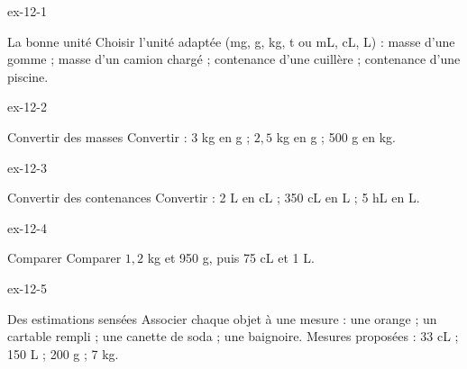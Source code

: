 \clearpage{}
\begin{blocLivre}{ex-12-1}\begin{exercice}[1]{La bonne unité}
Choisir l’unité adaptée (mg, g, kg, t ou mL, cL, L) : masse d’une gomme ; masse d’un camion chargé ; contenance d’une cuillère ; contenance d’une piscine.
\end{exercice}\end{blocLivre}
\begin{blocLivre}{ex-12-2}\begin{exercice}[1]{Convertir des masses}
Convertir : 3 kg en g ; $2{,}5$ kg en g ; 500 g en kg.
\end{exercice}\end{blocLivre}
\begin{blocLivre}{ex-12-3}\begin{exercice}[1]{Convertir des contenances}
Convertir : 2 L en cL ; 350 cL en L ; 5 hL en L.
\end{exercice}\end{blocLivre}
\begin{blocLivre}{ex-12-4}\begin{exercice}[1]{Comparer}
Comparer $1{,}2$ kg et 950 g, puis 75 cL et 1 L.
\end{exercice}\end{blocLivre}
\begin{blocLivre}{ex-12-5}\begin{exercice}[1]{Des estimations sensées}
Associer chaque objet à une mesure : une orange ; un cartable rempli ; une canette de soda ; une baignoire. Mesures proposées : 33 cL ; 150 L ; 200 g ; 7 kg.
\end{exercice}\end{blocLivre}

